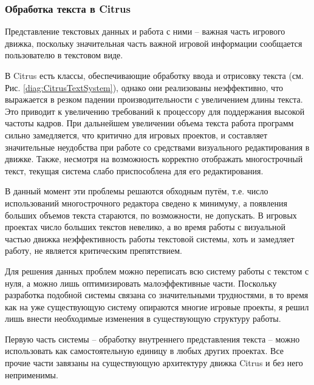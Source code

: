 \documentclass{fefu}
\begin{document}
			\subsubsection{Обработка текста в Citrus}
				\par Представление текстовых данных и работа с ними -- важная часть игрового
				движка, поскольку значительная часть важной игровой информации сообщается 
				пользователю в текстовом виде. 
				\par В Citrus есть классы, обеспечивающие обработку ввода и отрисовку текста 
				(см. Рис. \ref{diag:CitrusTextSystem}), 
				однако они реализованы неэффективно, что выражается в резком падении 
				производительности с увеличением длины текста. Это приводит к увеличению
				требований к процессору для поддержания высокой частоты кадров. При дальнейшем
				увеличении объема текста работа программ сильно замедляется, что критично для
				игровых проектов, и составляет значительные неудобства при работе со средствами
				визуального редактирования в движке. Также, несмотря на
				возможность корректно отображать многострочный текст, текущая система слабо
				приспособлена для его редактирования.
				\par В данный момент эти проблемы решаются обходным путём, т.е. число
				использований многострочного редактора сведено к минимуму, а появления больших
				объемов текста стараются, по возможности, не допускать. В игровых проектах
				число больших текстов невелико, а во время работы с визуальной частью движка
				неэффективность работы текстовой системы, хоть и замедляет работу, не является
				критическим препятствием.
				\par Для решения данных проблем можно переписать всю систему работы с текстом с
				нуля, а можно лишь оптимизировать малоэффективные части. Поскольку разработка 
				подобной системы связана со значительными трудностями, в то время как на уже
				существующую систему опираются многие игровые проекты, я решил лишь внести 
				необходимые изменения в существующую структуру работы.
				\par Первую часть системы -- обработку внутреннего представления текста -- 
				можно использовать как самостоятельную единицу в любых других проектах. Все 
				прочие части завязаны на существующую архитектуру движка Citrus и без него 
				неприменимы.
\end{document}
